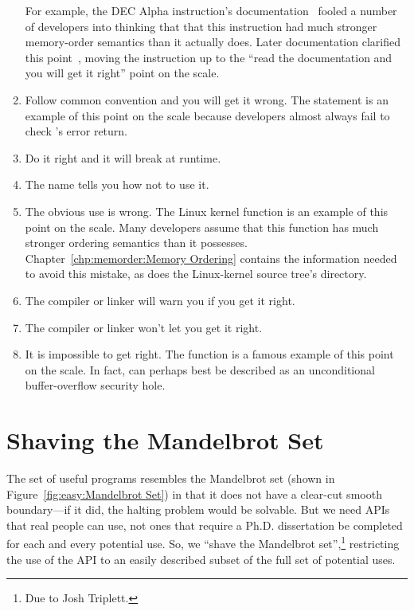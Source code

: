 \begin{enumerate}
	For example, the DEC Alpha  instruction's
	documentation~\cite{ALPHA95} fooled a
	number of developers into thinking that that this instruction
	had much stronger memory-order semantics than it actually does.
	Later documentation clarified this
	point~\cite{Compaq01,WilliamPugh2000Gharachorloo},
	moving the  instruction up to the
	``read the documentation and you will get it right'' point on
	the scale.
\item	Follow common convention and you will get it wrong.
	The  statement is an example of this point on the
	scale because
	developers almost always fail to check 's error return.
\item	Do it right and it will break at runtime.
\item	The name tells you how not to use it.
\item	The obvious use is wrong.
	The Linux kernel  function is an example of
	this point on the scale.
	Many developers assume that this function has much
	stronger ordering semantics than it possesses.
	Chapter~\ref{chp:memorder:Memory Ordering} contains the
	information needed to avoid this mistake, as does the
	Linux-kernel source tree's  directory.
\item	The compiler or linker will warn you if you get it right.
\item	The compiler or linker won't let you get it right.
\item	It is impossible to get right.
	The  function is a famous example of this point on
	the scale.
	In fact,  can perhaps best be described as
	an unconditional buffer-overflow security hole.
\end{enumerate}

\section{Shaving the Mandelbrot Set}
\label{sec:easy:Shaving the Mandelbrot Set}

The set of useful programs resembles the Mandelbrot set
(shown in Figure~\ref{fig:easy:Mandelbrot Set})
in that it does
not have a clear-cut smooth boundary---if it did, the halting problem
would be solvable.
But we need APIs that real people can use, not ones that require a
Ph.D. dissertation be completed for each and every potential use.
So, we ``shave the Mandelbrot set'',\footnote{
	Due to Josh Triplett.}
restricting the use of the
API to an easily described subset of the full set of potential uses.

